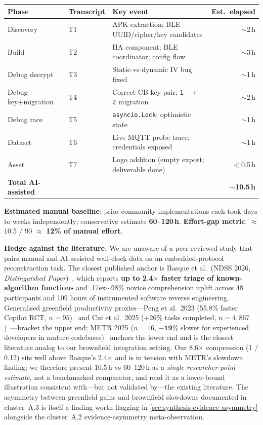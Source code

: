 \documentclass[11pt,a4paper]{article}
\begin{document}
\begin{center}
\begin{tabularx}{\linewidth}{@{}l l >{\raggedright\arraybackslash}X r@{}}
\toprule
Phase & Transcript & Key event & Est.\ elapsed \\
\midrule
Discovery    & T1 & APK extraction; BLE UUID/cipher/key candidates & $\sim$2\,h \\
Build        & T2 & HA component; BLE coordinator; config flow     & $\sim$3\,h \\
Debug decrypt& T3 & Static-vs-dynamic IV bug fixed                 & $\sim$1\,h \\
Debug key+migration & T4 & Correct CB key pair; \texttt{1\,$\to$\,2} migration & $\sim$2\,h \\
Debug race   & T5 & \texttt{asyncio.Lock}; optimistic state        & $\sim$1\,h \\
Dataset      & T6 & Live MQTT probe trace; credentials exposed     & $\sim$1\,h \\
Asset        & T7 & Logo addition (empty export; deliverable done) & $<$0.5\,h \\
\midrule
\textbf{Total AI-assisted} & & & \textbf{$\sim$10.5\,h} \\
\bottomrule
\end{tabularx}
\end{center}

\textbf{Estimated manual baseline}: prior community implementations each took
days to weeks independently; conservative estimate \textbf{60--120\,h}.
\textbf{Effort-gap metric}: $\approx$10.5 / 90 $\approx$ \textbf{12\% of manual effort}.

\textbf{Hedge against the literature.} We are unaware of a peer-reviewed
study that pairs manual and AI-assisted wall-clock data on an
embedded-protocol reconstruction task. The closest published anchor is
Basque et al.\ (NDSS 2026, \emph{Distinguished Paper})~\citep{basque2026synergy},
which reports \textbf{up to 2.4$\times$ faster triage of known-algorithm
functions} and {\raise.17ex\hbox{$\scriptstyle\sim$}}98\% novice
comprehension uplift across 48 participants and 109 hours of instrumented
software reverse engineering. Generalised greenfield productivity
proxies---Peng et al.\ 2023 (55.8\% faster Copilot RCT, $n{=}95$)~\citep{peng2023copilot}
and Cui et al.\ 2025 ($+$26\% tasks completed, $n{=}4{,}867$)~\citep{cui2025genai}---bracket
the upper end; METR 2025 ($n{=}16$, $\mathbf{-19\%}$ slower for
experienced developers in mature codebases)~\citep{metr2025productivity} anchors
the lower end and is the closest literature analog to our brownfield
integration setting. Our 8.6$\times$ compression (1 / 0.12) sits well
above Basque's 2.4$\times$ and is in tension with METR's slowdown
finding; we therefore present 10.5\,h vs 60--120\,h as a
\emph{single-researcher point estimate}, not a benchmarked comparator,
and read it as a lower-bound illustration consistent with---but not
validated by---the existing literature. The asymmetry between
greenfield gains and brownfield slowdowns documented in cluster~A.3 is
itself a finding worth flagging in
\cref{sec:synthesis-evidence-asymmetry} alongside the cluster~A.2
evidence-asymmetry meta-observation.
\end{document}
